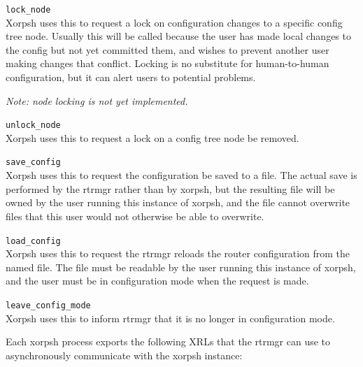 \documentclass[11pt]{article}
\begin{document}
\begin{description}
  \item{\tt lock\_node} \\Xorpsh uses this to request a lock on
configuration changes to a specific config tree node.  Usually this
will be called because the user has made local changes to the config
but not yet committed them, and wishes to prevent another user making
changes that conflict.  Locking is no substitute for human-to-human
configuration, but it can alert users to potential problems.

{\it Note: node locking is not yet implemented.}

  \item{\tt unlock\_node} \\Xorpsh uses this to request a lock on a
config tree node be removed.

  \item{\tt save\_config} \\Xorpsh uses this to request the
configuration be saved to a file.  The actual save is performed by the
rtrmgr rather than by xorpsh, but the resulting file will be owned by
the user running this instance of xorpsh, and the file cannot
overwrite files that this user would not otherwise be able to
overwrite.

  \item{\tt load\_config} \\Xorpsh uses this to request the rtrmgr reloads
the router configuration from the named file.  The file must be
readable by the user running this instance of xorpsh, and the user
must be in configuration mode when the request is made.

  \item{\tt leave\_config\_mode} \\Xorpsh uses this to inform rtrmgr that
it is no longer in configuration mode.

\end{description}

\vspace{0.2in}
Each xorpsh process exports the following XRLs that the rtrmgr can use
to asynchronously communicate with the xorpsh instance:
\end{document}
